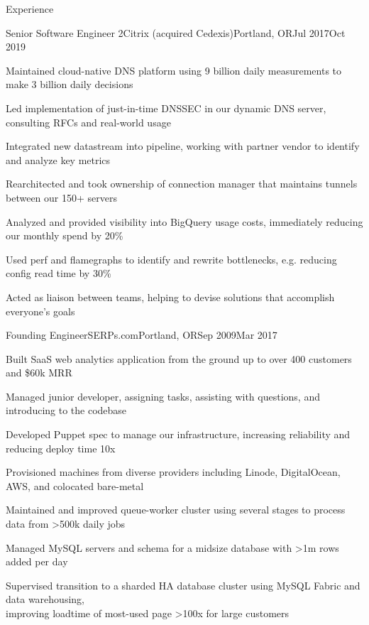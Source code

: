 \documentclass[letterpaper,12pt]{article}
\begin{document}
\begin{paracol}{2}
\begin{res_section}{Experience}
  \begin{res_experienceitem}{Senior Software Engineer 2}{Citrix (acquired Cedexis)}{Portland, OR}{Jul 2017}{Oct 2019}
  \item Maintained cloud-native DNS platform using 9 billion daily measurements to make 3 billion daily decisions
  \item Led implementation of just-in-time DNSSEC in our dynamic DNS server, consulting RFCs and real-world usage
  \item Integrated new datastream into pipeline, working with partner vendor to identify and analyze key metrics
  \item Rearchitected and took ownership of connection manager that maintains tunnels between our 150+ servers
  \item Analyzed and provided visibility into BigQuery usage costs, immediately reducing our monthly spend by 20\%
  \item Used perf and flamegraphs to identify and rewrite bottlenecks, e.g. reducing config read time by 30\%
  \item Acted as liaison between teams, helping to devise solutions that accomplish everyone's goals
\end{res_experienceitem}
\begin{res_experienceitem}{Founding Engineer}{SERPs.com}{Portland, OR}{Sep 2009}{Mar 2017}
  \item Built SaaS web analytics application from the ground up to over 400 customers and \$60k MRR
  \item Managed junior developer, assigning tasks, assisting with questions, and introducing to the codebase
  \item Developed Puppet spec to manage our infrastructure, increasing reliability and reducing deploy time 10x
  \item Provisioned machines from diverse providers including Linode, DigitalOcean, AWS, and colocated bare-metal
  \item Maintained and improved queue-worker cluster using several stages to process data from \textgreater500k daily jobs
  \item Managed MySQL servers and schema for a midsize database with \textgreater1m rows added per day
  \item Supervised transition to a sharded HA database cluster using MySQL Fabric and data warehousing,\\
        improving loadtime of most-used page \textgreater100x for large customers

\end{res_experienceitem}
\end{res_section}
\end{paracol}
\end{document}
